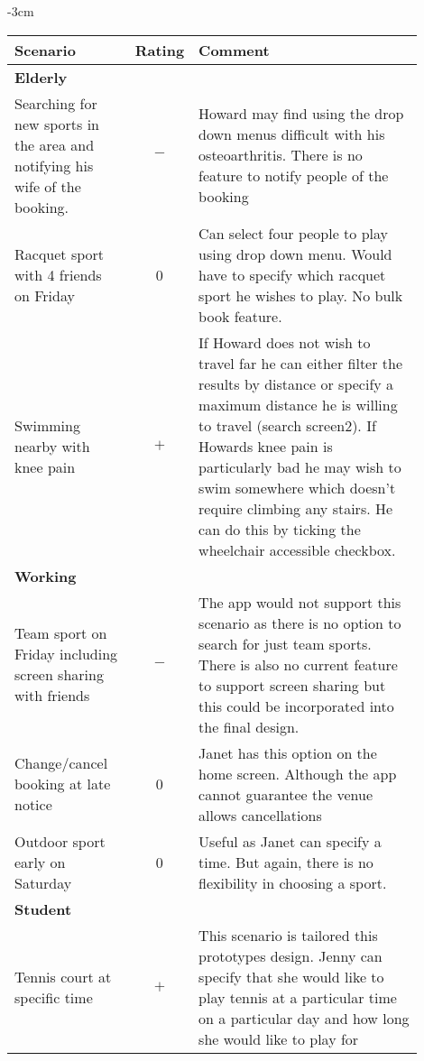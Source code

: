 \begin{center}
	\begin{adjustwidth*}{}{-3cm}
	\renewcommand{\arraystretch}{2}
	\begin{longtable}{@{\extracolsep{\fill}}p{0.3\linewidth} c p{0.6\linewidth}}
		\toprule
		\textbf{Scenario} & \textbf{Rating} & \textbf{Comment}\\
		\midrule
		\midrule
		\multicolumn{3}{l}{\textbf{Elderly}}\\
		\cmidrule(r){1-3}
		Searching for new sports in the area and notifying his wife of the
		booking. & $-$ & Howard may find using the drop down menus difficult
		with his osteoarthritis. There is no feature to notify people of the
		booking \\

		Racquet sport with 4 friends on Friday & 0 & Can select four people
		to play using drop down menu. Would have to specify which racquet sport
		he wishes to play. No bulk book feature. \\

		Swimming nearby with knee pain & $+$ & If Howard does not wish to
		travel far he can either filter the results by distance or specify a
		maximum distance he is willing to travel (search screen2). If Howards
		knee pain is particularly bad he may wish to swim somewhere which
		doesn't require climbing any stairs. He can do this by ticking the
		wheelchair accessible checkbox. \\

		\midrule
		\multicolumn{3}{l}{\textbf{Working}}\\
		\cmidrule(r){1-3}
		Team sport on Friday including screen sharing with friends & $-$ & The
		app would not support this scenario as there is no option to search for
		just team sports. There is also no current feature to support screen
		sharing but this could be incorporated into the final design. \\

		Change/cancel booking at late notice & 0 & Janet has this option on
		the home screen. Although the app cannot guarantee the venue allows
		cancellations \\

		Outdoor sport early on Saturday & 0 & Useful as Janet can specify a
		time. But again, there is no flexibility in choosing a sport. \\

		\midrule
		\multicolumn{3}{l}{\textbf{Student}}\\
		\cmidrule(r){1-3}
		Tennis court at specific time & $+$ & This scenario is tailored this
		prototypes design. Jenny can specify that she would like to play tennis
		at a particular time on a particular day and how long she would like to
		play for \\


\end{longtable}
\end{adjustwidth*}
\end{center}
